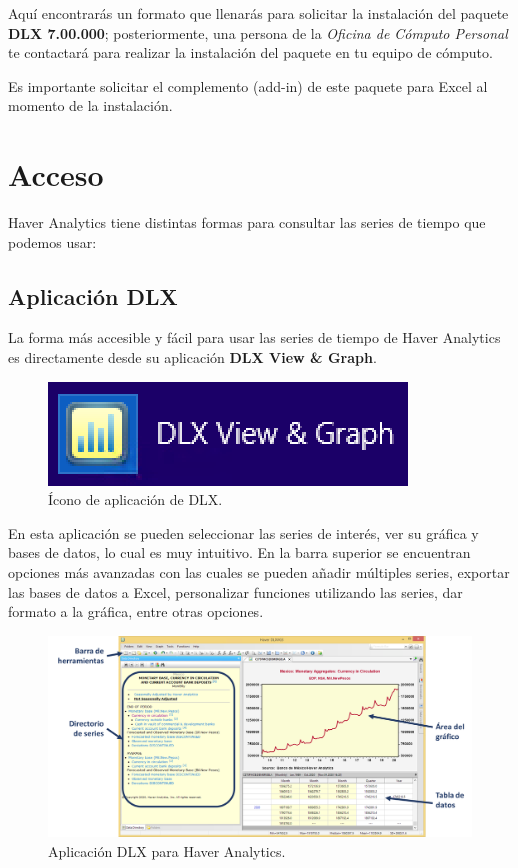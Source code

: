 \documentclass[
]{book}
\begin{document}
Aquí encontrarás un formato que llenarás para solicitar la instalación del paquete \textbf{DLX 7.00.000}; posteriormente, una persona de la \emph{Oficina de Cómputo Personal} te contactará para realizar la instalación del paquete en tu equipo de cómputo.

Es importante solicitar el complemento (add-in) de este paquete para Excel al momento de la instalación.

\hypertarget{acceso}{%
\chapter{Acceso}\label{acceso}}

Haver Analytics tiene distintas formas para consultar las series de tiempo que podemos usar:

\hypertarget{aplicaciuxf3n-dlx}{%
\section{Aplicación DLX}\label{aplicaciuxf3n-dlx}}

La forma más accesible y fácil para usar las series de tiempo de Haver Analytics es directamente desde su aplicación \textbf{DLX View \& Graph}.

\begin{figure}

{\centering \includegraphics[width=0.25\linewidth]{_img/dlx_logo} 

}

\caption{Ícono de aplicación de DLX.}\label{fig:icono}
\end{figure}

En esta aplicación se pueden seleccionar las series de interés, ver su gráfica y bases de datos, lo cual es muy intuitivo. En la barra superior se encuentran opciones más avanzadas con las cuales se pueden añadir múltiples series, exportar las bases de datos a Excel, personalizar funciones utilizando las series, dar formato a la gráfica, entre otras opciones.

\begin{figure}

{\centering \includegraphics[width=1\linewidth]{_img/dlx_app} 

}

\caption{Aplicación DLX para Haver Analytics.}\label{fig:app}
\end{figure}
\end{document}

